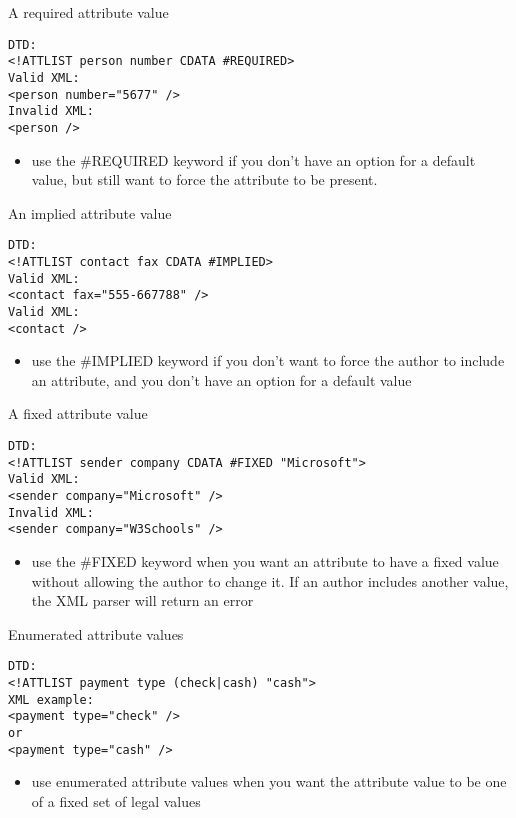 \documentclass[11pt]{article}
\begin{document}
A required attribute value
\lstset{breaklines=true,language=XML,label= ,caption= ,captionpos=b,numbers=none}
\begin{lstlisting}
DTD:
<!ATTLIST person number CDATA #REQUIRED>
Valid XML:
<person number="5677" />
Invalid XML:
<person />
\end{lstlisting}
\begin{itemize}
\item use the \#REQUIRED keyword if you don't have an option for a default value, but still want to force the attribute to be present.
\end{itemize}

An implied attribute value
\lstset{breaklines=true,language=XML,label= ,caption= ,captionpos=b,numbers=none}
\begin{lstlisting}
DTD:
<!ATTLIST contact fax CDATA #IMPLIED>
Valid XML:
<contact fax="555-667788" />
Valid XML:
<contact />
\end{lstlisting}
\begin{itemize}
\item use the \#IMPLIED keyword if you don't want to force the author to include an attribute, and you don't have an option for a default value
\end{itemize}

A fixed attribute value
\lstset{breaklines=true,language=XML,label= ,caption= ,captionpos=b,numbers=none}
\begin{lstlisting}
DTD:
<!ATTLIST sender company CDATA #FIXED "Microsoft">
Valid XML:
<sender company="Microsoft" />
Invalid XML:
<sender company="W3Schools" />
\end{lstlisting}
\begin{itemize}
\item use the \#FIXED keyword when you want an attribute to have a fixed value without allowing the author to change it. If an author includes another value, the XML parser will return an error
\end{itemize}

Enumerated attribute values
\lstset{breaklines=true,language=XML,label= ,caption= ,captionpos=b,numbers=none}
\begin{lstlisting}
DTD:
<!ATTLIST payment type (check|cash) "cash">
XML example:
<payment type="check" />
or
<payment type="cash" />
\end{lstlisting}
\begin{itemize}
\item use enumerated attribute values when you want the attribute value to be one of a fixed set of legal values
\end{itemize}
\end{document}
